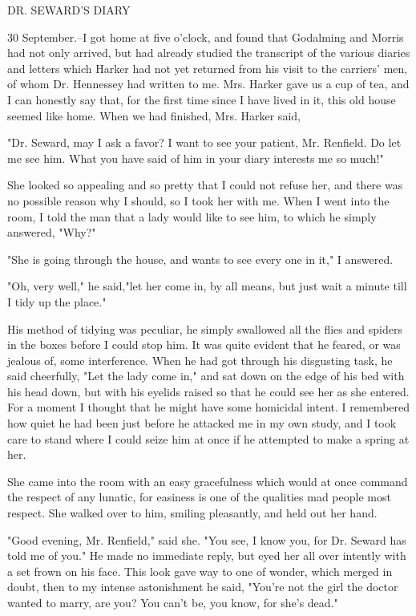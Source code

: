 DR. SEWARD'S DIARY 

30 September.--I got home at five o'clock, and found that Godalming and Morris had not only arrived, but had already studied the transcript of the various diaries and letters which Harker had not yet returned from his visit to the carriers' men, of whom Dr. Hennessey had written to me. Mrs. Harker gave us a cup of tea, and I can honestly say that, for the first time since I have lived in it, this old house seemed like home. When we had finished, Mrs. Harker said, 

"Dr. Seward, may I ask a favor? I want to see your patient, Mr. Renfield. Do let me see him. What you have said of him in your diary interests me so much!" 

She looked so appealing and so pretty that I could not refuse her, and there was no possible reason why I should, so I took her with me. When I went into the room, I told the man that a lady would like to see him, to which he simply answered, "Why?" 

"She is going through the house, and wants to see every one in it," I answered. 

"Oh, very well," he said,"let her come in, by all means, but just wait a minute till I tidy up the place." 

His method of tidying was peculiar, he simply swallowed all the flies and spiders in the boxes before I could stop him. It was quite evident that he feared, or was jealous of, some interference. When he had got through his disgusting task, he said cheerfully, "Let the lady come in," and sat down on the edge of his bed with his head down, but with his eyelids raised so that he could see her as she entered. For a moment I thought that he might have some homicidal intent. I remembered how quiet he had been just before he attacked me in my own study, and I took care to stand where I could seize him at once if he attempted to make a spring at her. 

She came into the room with an easy gracefulness which would at once command the respect of any lunatic, for easiness is one of the qualities mad people most respect. She walked over to him, smiling pleasantly, and held out her hand. 

"Good evening, Mr. Renfield," said she. "You see, I know you, for Dr. Seward has told me of you." He made no immediate reply, but eyed her all over intently with a set frown on his face. This look gave way to one of wonder, which merged in doubt, then to my intense astonishment he said, "You're not the girl the doctor wanted to marry, are you? You can't be, you know, for she's dead." 

